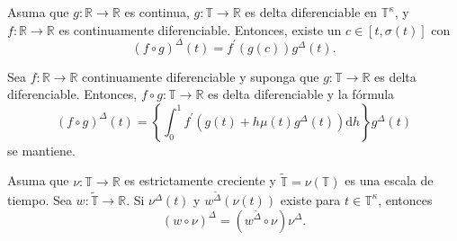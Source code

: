 \begin{frame}
		\begin{theorem}
		Asuma que $g\colon\mathds{R}\rightarrow\mathds{R}$ es continua, $g\colon\mathds{T}\rightarrow\mathds{R}$ es delta diferenciable en $\mathds{T}^{\kappa}$, y $f\colon\mathds{R}\rightarrow\mathds{R}$ es continuamente diferenciable. Entonces, existe un $c\in\left[t,\sigma\left(t\right)\right]$ con \[ {\left(f\circ g\right)}^{\Delta}\left(t\right)=f^{\prime}\left(g\left(c\right)\right)g^{\Delta}\left(t\right). \]
	\end{theorem}
	
	\begin{theorem}
		Sea $f\colon\mathds{R}\rightarrow\mathds{R}$ continuamente diferenciable y suponga que $g\colon\mathds{T}\rightarrow\mathds{R}$ es delta diferenciable. Entonces, $f\circ g\colon\mathds{T}\rightarrow\mathds{R}$ es delta diferenciable y la fórmula \[ {\left(f\circ g\right)}^{\Delta}\left(t\right)=\left\{\int_{0}^{1}f^{\prime}\left(g\left(t\right)+h\mu\left(t\right)g^{\Delta}\left(t\right)\right)\mathrm{d}h\right\}g^{\Delta}\left(t\right) \] se mantiene.
	\end{theorem}

	\begin{theorem}
		Asuma que $\nu\colon\mathds{T}\rightarrow\mathds{R}$ es estrictamente creciente y $\tilde{\mathds{T}}=\nu\left(\mathds{T}\right)$ es una escala de tiempo. Sea $w\colon\tilde{\mathds{T}}\rightarrow\mathds{R}$. Si $\nu^{\Delta}\left(t\right)$ y $w^{\tilde{\Delta}}\left(\nu\left(t\right)\right)$ existe para $t\in\mathds{T}^{\kappa}$, entonces \[ {\left(w\circ\nu\right)}^{\Delta}=\left(w^{\tilde{\Delta}}\circ\nu\right)\nu^{\Delta}. \]
	\end{theorem}

\end{frame}

